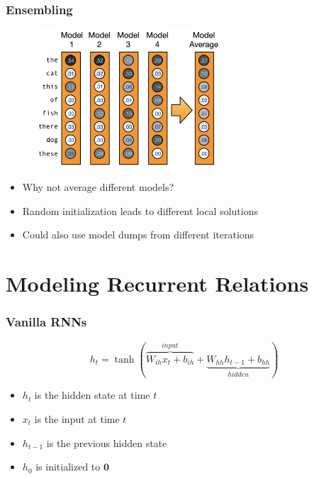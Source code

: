 \documentclass[usenames,dvipsnames]{beamer}
\begin{document}
\begin{frame}
\frametitle{Ensembling}
\begin{figure}
  \centering
  \includegraphics[width=7cm, valign=c]{assets/ensemble}
\end{figure}
\begin{itemize}
  \item Why not average different models?
  \item Random initialization leads to different local solutions
  \item Could also use model dumps from different iterations
\end{itemize}
\end{frame}


\section{Modeling Recurrent Relations}

\begin{frame}
\frametitle{Vanilla RNNs}
\begin{equation*}
  h_t = \tanh \left( \overbrace{W_{ih} x_t + b_{ih}}^{input} + \underbrace{W_{hh} h_{t-1} + b_{hh}}_{hidden} \right)
\end{equation*}
\begin{itemize}
  \item $h_t$ is the hidden state at time $t$
  \item $x_t$ is the input at time $t$
  \item $h_{t-1}$ is the previous hidden state
  \item $h_0$ is initialized to $\mathbf{0}$

\end{itemize}
\end{frame}
\end{document}
